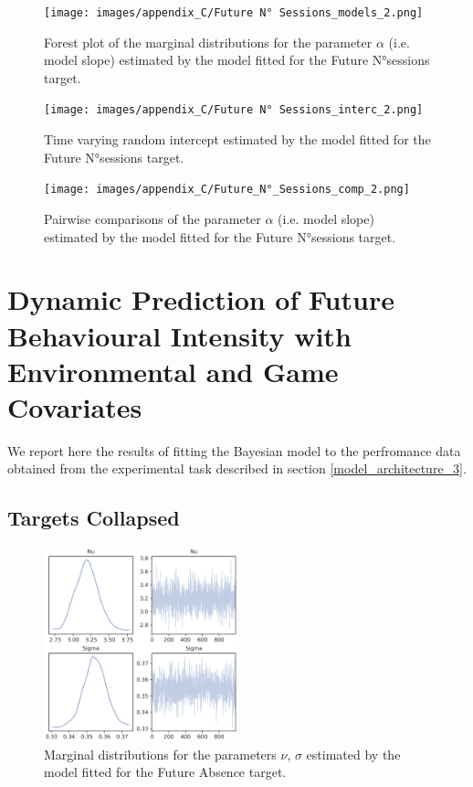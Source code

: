 \begin{figure}[H]
\centering
\texttt{[image: images/appendix\_C/Future N° Sessions\_models\_2.png]}
\caption[\textbf{Future N°sessions model fixed effect}]{Forest plot of the marginal distributions for the parameter $\alpha$ (i.e. model slope) estimated by the model fitted for the Future N°sessions target.}
\label{model_no_sess_2}
\end{figure}

\begin{figure}[H]
\centering
\texttt{[image: images/appendix\_C/Future N° Sessions\_interc\_2.png]}
\caption[\textbf{Future N°sessions time-varying random intercept}]{Time varying random intercept estimated by the model fitted for the Future N°sessions target.}
\label{interc_no_sess_2}
\end{figure}

\begin{figure}[H]
\centering
\texttt{[image: images/appendix\_C/Future\_N°\_Sessions\_comp\_2.png]}
\caption[\textbf{Future N°sessions pairwise comparisons of model fixed effect}]{Pairwise comparisons of the parameter $\alpha$ (i.e. model slope) estimated by the model fitted for the Future N°sessions target.}
\label{comp_no_sess_2}
\end{figure}

\section{Dynamic Prediction of Future Behavioural Intensity with Environmental and Game Covariates}
\label{dynamic_env_even_prediction_ancillary_perf}

We report here the results of fitting the Bayesian model to the perfromance data obtained from the experimental task described in section \ref{model_architecture_3}.

\subsection{Targets Collapsed}
\label{collapsed_bayes_3}

\begin{figure}[H]
\centering
\includegraphics[width=0.5\textwidth]{images/appendix_C/collapsed_marginals_3.png}
\caption[\textbf{Targets collapsed marginal distributions}]{Marginal distributions for the parameters $\nu$, $\sigma$ estimated by the model fitted for the Future Absence target.}
\label{marginals_coll_3}
\end{figure}

